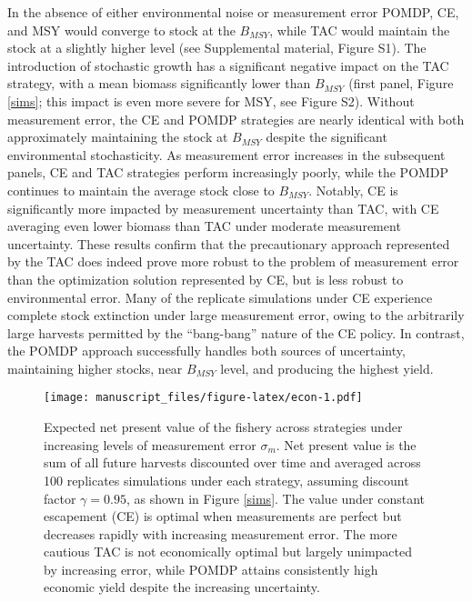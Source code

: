 \documentclass[3p]{elsarticle} %
\makeatletter
\def\maxwidth{\ifdim\Gin@nat@width>\linewidth\linewidth
\else\Gin@nat@width\fi}
\let\Oldincludegraphics\includegraphics
\renewcommand{\includegraphics}[1]{\Oldincludegraphics[width=\maxwidth]{#1}}
\makeatother
\begin{document}
In the absence of either environmental noise or measurement error POMDP,
CE, and MSY would converge to stock at the \(B_{MSY}\), while TAC would
maintain the stock at a slightly higher level (see Supplemental
material, Figure S1). The introduction of stochastic growth has a
significant negative impact on the TAC strategy, with a mean biomass
significantly lower than \(B_{MSY}\) (first panel, Figure \ref{sims};
this impact is even more severe for MSY, see Figure S2). Without
measurement error, the CE and POMDP strategies are nearly identical with
both approximately maintaining the stock at \(B_{MSY}\) despite the
significant environmental stochasticity. As measurement error increases
in the subsequent panels, CE and TAC strategies perform increasingly
poorly, while the POMDP continues to maintain the average stock close to
\(B_{MSY}\). Notably, CE is significantly more impacted by measurement
uncertainty than TAC, with CE averaging even lower biomass than TAC
under moderate measurement uncertainty. These results confirm that the
precautionary approach represented by the TAC does indeed prove more
robust to the problem of measurement error than the optimization
solution represented by CE, but is less robust to environmental error.
Many of the replicate simulations under CE experience complete stock
extinction under large measurement error, owing to the arbitrarily large
harvests permitted by the ``bang-bang'' nature of the CE policy. In
contrast, the POMDP approach successfully handles both sources of
uncertainty, maintaining higher stocks, near \(B_{MSY}\) level, and
producing the highest yield.

\begin{figure}
\centering
\texttt{[image: manuscript\_files/figure-latex/econ-1.pdf]}
\caption{Expected net present value of the fishery across strategies
under increasing levels of measurement error \(\sigma_m\). Net present
value is the sum of all future harvests discounted over time and
averaged across 100 replicates simulations under each strategy, assuming
discount factor \(\gamma = 0.95\), as shown in Figure \ref{sims}. The
value under constant escapement (CE) is optimal when measurements are
perfect but decreases rapidly with increasing measurement error. The
more cautious TAC is not economically optimal but largely unimpacted by
increasing error, while POMDP attains consistently high economic yield
despite the increasing uncertainty. \label{econ}}
\end{figure}
\end{document}
